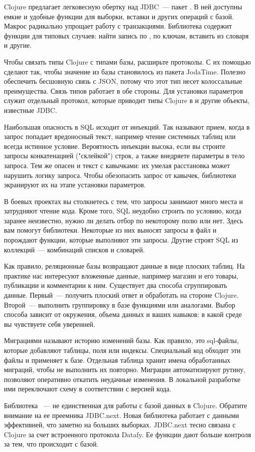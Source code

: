 Clojure предлагает легковесную обертку над JDBC~--- пакет . В ней доступны емкие и удобные функции для выборки, вставки и других операций с базой. Макрос  радикально упрощает работу с транзакциями. Библиотека содержит функции для типовых случаев: найти запись по , по ключам, вставить из словаря и другие.

Чтобы связать типы Clojure с типами базы, расширьте протоколы. С их помощью сделают так, чтобы значение  из базы становилось  из пакета JodaTime. Полезно обеспечить бесшовную связь с JSON, потому что этот тип несет колоссальные преимущества. Связь типов работает в обе стороны. Для установки параметров служит отдельный протокол, которые приводит типы Clojure в  и другие объекты, известные JDBC.

Наибольшая опасность в SQL исходит от инъекций. Так называют прием, когда в запрос попадает вредоносный текст, например чтение системных таблиц или всегда истинное условие. Вероятность инъекции высока, если вы строите запросы конкатенацией ("склейкой") строк, а также внедряете параметры в тело запроса. Тем же опасен и текст с кавычками: их умелая расстановка может нарушить логику запроса. Чтобы обезопасить запрос от кавычек, библиотеки экранируют их на этапе установки параметров.

В боевых проектах вы столкнетесь с тем, что запросы занимают много места и затрудняют чтение кода. Кроме того, SQL неудобно строить по условию, когда заранее неизвестно, нужно ли делать отбор по некоторому полю или нет. Здесь вам помогут библиотеки. Некоторые из них выносят запросы в файл и порождают функции, которые выполняют эти запросы. Другие строят SQL из коллекций~--- комбинаций списков и словарей.

Как правило, реляционные базы возвращают данные в виде плоских таблиц. На практике нас интересуют вложенные данные, например магазин и его товары, публикации и комментарии к ним. Существует два способа сгруппировать данные. Первый~--- получить плоский ответ и обработать на стороне Clojure. Второй~--- выполнить группировку в базе функциями  или аналогами. Выбор способа зависит от окружения, объема данных и ваших навыков: в какой среде вы чувствуете себя уверенней.

Миграциями называют историю изменений базы. Как правило, это sql-файлы, которые добавляют таблицы, поля или индексы. Специальный код обходит эти файлы и применяет к базе. Отдельная таблица хранит имена обработанных миграций, чтобы не выполнить их повторно. Миграции автоматизируют рутину, позволяют оперативно откатить неудачные изменения. В локальной разработке ими переключают схему в соответствии с версией кода.

Библиотека ~--- не единственная для работы с базой данных в Clojure. Обратите внимание на ее преемника JDBC.next. Новая библиотека работает с данными эффективней, что заметно на больших выборках. JDBC.next тесно связана с Clojure за счет встроенного протокола Datafy. Ее функции дают больше контроля за тем, что происходит с базой.
